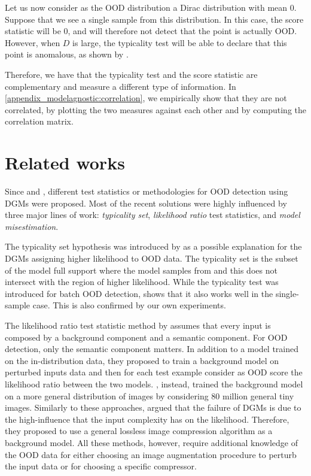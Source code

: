 {Let us now consider as the OOD distribution a Dirac distribution with mean $0$. Suppose that we see a single sample from this distribution. In this case, the score statistic will be $0$, and will therefore not detect that the point is actually OOD. However, when $D$ is large, the typicality test will be able to declare that this point is anomalous, as shown by \textcite{nalisnick_detecting_2019}.

Therefore, we have that the typicality test and the score statistic are complementary and measure a different type of information. In \cref{appendix_modelagnostic:correlation}, we empirically show that they are not correlated, by plotting the two measures against each other and by computing the correlation matrix.



\section{Related works}
\label{sec_modelagnostic:related_works}

Since \textcite{nalisnick_deep_2019} and \textcite{hendrycks_deep_2019}, different test statistics or methodologies for OOD detection using DGMs were proposed. Most of the recent solutions were highly influenced by three major lines of work: \emph{typicality set}, \emph{likelihood ratio} test statistics, and \emph{model misestimation}. 

The typicality set hypothesis was introduced by \textcite{nalisnick_detecting_2019} as a possible explanation for the DGMs assigning higher likelihood to OOD data. The typicality set is the subset of the model full support where the model samples from and this does not intersect with the region of higher likelihood. While the typicality test was introduced for batch OOD detection, \textcite{morningstar_density_2021} shows that it also works well in the single-sample case. This is also confirmed by our own experiments. 

The likelihood ratio test statistic method by \textcite{ren_likelihood_2019} assumes that every input is composed by a background component and a semantic component. For OOD detection, only the semantic component matters. In addition to a model trained on the in-distribution data, they proposed to train a background model on perturbed inputs data and then for each test example consider as OOD score the likelihood ratio between the two models. \textcite{schirrmeister_understanding_2020}, instead, trained the background model on a more general distribution of images by considering 80 million general tiny images. Similarly to these approaches, \textcite{serra_input_2020} argued that the failure of DGMs is due to the high-influence that the input complexity has on the likelihood. Therefore, they proposed to use a general lossless image compression algorithm as a background model.
All these methods, however, require additional knowledge of the OOD data for either choosing an image augmentation procedure to perturb the input data or for choosing a specific compressor. 

}
